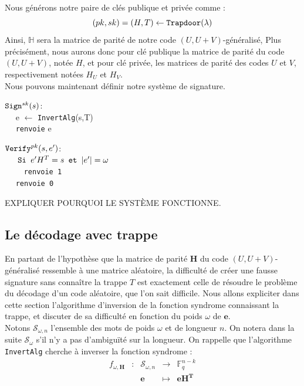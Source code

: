 \documentclass[12pt]{article}
\theoremstyle{plain}
\theoremstyle{definition}
\newcommand{\F}{\mathbb{F}}
\newcommand{\e}{\mathbf{e}}
\begin{document}
\noindent Nous générons notre paire de clés publique et privée comme :
$$ (pk, sk) = (H,T) \leftarrow \verb|Trapdoor|(\lambda)$$
Ainsi, $\mathbb{H}$ sera la matrice de parité de notre code $(U,U+V)$-généralisé, 
Plus précisément, nous aurons donc pour clé publique la matrice de parité du code $(U,U+V)$, notée $H$, et pour clé privée, les matrices de parité des codes $U$ et $V$, respectivement notées $H_U$ et $H_V$.\\
Nous pouvons maintenant définir notre système de signature.
\begin{multicols}{2}
\begin{flushleft}
$\verb|Sign|^{sk}(s)$:\\
	$\quad$ e $\leftarrow$  \verb|InvertAlg|(s,T) \\
	$\quad$ \verb|renvoie| e
\end{flushleft}
\begin{flushleft}
$\verb|Verify|^{pk}(s,e')$: \\
	$\quad \verb| Si | e'H^T = s \verb| et | |e'| = \omega $ \\
	$\quad \quad$ \verb|renvoie 1| \\
	$\quad$ \verb|renvoie 0|
\end{flushleft}
\end{multicols}

EXPLIQUER POURQUOI LE SYSTÈME FONCTIONNE.

\subsection{Le décodage avec trappe}

En partant de l'hypothèse que la matrice de parité $\mathbf{H}$ du code $(U,U+V)$-généralisé ressemble à une matrice aléatoire, la difficulté de créer une fausse signature sans connaître la trappe $T$ est exactement celle de résoudre le problème du décodage d'un code aléatoire, que l'on sait difficile. Nous allons expliciter dans cette section l'algorithme d'inversion de la fonction syndrome connaissant la trappe, et discuter de sa difficulté en fonction du poids $\omega$ de $\e$. \\

\noindent Notons $\mathcal{S}_{\omega,n}$ l'ensemble des mots de poids $\omega$ et de longueur $n$. On notera dans la suite $\mathcal{S}_{\omega}$ s'il n'y a pas d’ambiguïté sur la longueur. On rappelle que l'algorithme \verb|InvertAlg| cherche à inverser la fonction syndrome : 
$$\begin{array}{ccccc}
f_{\omega,\mathbf{H}} & : & \mathcal{S}_{\omega,n} & \to & \F_q^{n-k} \\
 & & \mathbf{e} & \mapsto & \mathbf{eH^T} \\
\end{array}$$
\end{document}
